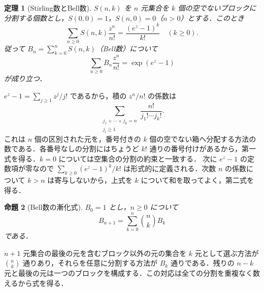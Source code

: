 \documentclass[a5paper,10pt,onecolumn]{jsarticle}
\makeatletter
\theoremstyle{mathnotetheorem}
\newtheorem{theorem}{定理}[section]
\newtheorem{proposition}[theorem]{命題}
\renewcommand{\proofname}{証明}
\renewenvironment{proof}[1][\proofname]{%
  \par\pushQED{\qed}\normalfont\topsep4\p@\@plus2\p@\relax
  \trivlist\item[\hskip\labelsep\bfseries #1]\ignorespaces
}{\popQED\endtrivlist\@endpefalse}
\makeatother
\begin{document}
\begin{theorem}[Stirling数とBell数]\label{thm:bell}
$S(n,k)$ を $n$ 元集合を $k$ 個の空でないブロックに分割する個数とし，$S(0,0)=1$，$S(n,0)=0$（$n>0$）とする．このとき
\[
 \sum_{n\ge0}S(n,k)\frac{z^n}{n!}
 =\frac{(e^z-1)^k}{k!}\quad(k\ge0).
\]
従って $B_n=\sum_{k=0}^nS(n,k)$（Bell数）について
\[
 \sum_{n\ge0}B_n\frac{z^n}{n!}
 =\exp(e^z-1)
\]
が成り立つ．
\end{theorem}
\begin{proof}
$e^z-1=\sum_{j\ge1}z^j/j!$ であるから，積の $z^n/n!$ の係数は
\[
 \sum_{\substack{j_1+\cdots+j_k=n\\j_i\ge1}}
 \frac{n!}{j_1!\cdots j_k!}.
\]
これは $n$ 個の区別された元を，番号付きの $k$ 個の空でない箱へ分配する方法の数である．各番号なしの分割にはちょうど $k!$ 通りの番号付けがあるから，第一式を得る．$k=0$ については空集合の分割の約束と一致する．
次に $e^z-1$ の定数項が零なので $\sum_{k\ge0}(e^z-1)^k/k!$ は形式的に定義される．次数 $n$ の係数について $k>n$ は寄与しないから，上式を $k$ について和を取ってよく，第二式を得る．
\end{proof}

\begin{proposition}[Bell数の漸化式]
$B_0=1$ とし，$n\ge0$ について
\[
 B_{n+1}=\sum_{k=0}^n\binom nk B_k
\]
である．
\end{proposition}
\begin{proof}
$n+1$ 元集合の最後の元を含むブロック以外の元の集合を $k$ 元として選ぶ方法が $\binom nk$ 通りあり，それらを任意に分割する方法が $B_k$ 通りである．残りの $n-k$ 元と最後の元は一つのブロックを構成する．この対応は全ての分割を重複なく数えるから式を得る．
\end{proof}
\end{document}
